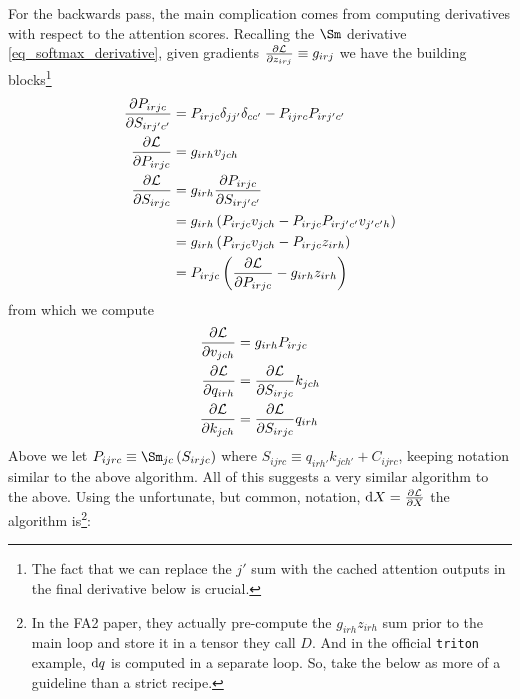 \documentclass[11pt]{article}
\begin{document}
For the backwards pass, the main complication comes from computing derivatives with respect to the
attention scores. Recalling the $ \Sm $ derivative \eqref{eq_softmax_derivative}, given gradients $
\frac{\partial \mathcal{L}   }{ \partial z _{ irj } } \equiv  g _{ irj } $ we have the building
blocks\footnote{The fact that we can replace the  $ j' $ sum with the cached attention outputs in
the final derivative below is crucial.}
\begin{align}
    \frac{ \partial P _{ irjc } }{ \partial S _{ irj'c' } } &= P _{ irjc}\delta _{ jj' }\delta _{ c c'} - P _{ ijrc } P _{ irj'c' } \nonumber\\
    \frac{ \partial \mathcal{L} }{ \partial P _{ irjc } } &= g _{ irh } v _{ jch }  \nonumber\\
    \frac{ \partial \mathcal{L} }{ \partial S _{ irjc } } &= g _{ irh } \frac{ \partial P _{ irjc } }{ \partial S _{ irj'c' } }\nonumber\\
                                                    &= g _{ irh } \left ( P _{ irjc } v _{ jch } - P _{ irjc } P _{ ir j'c' } v _{ j'c'h }  \right )  \nonumber\\
                                                    &= g _{ irh } \left ( P _{ irjc } v _{ jch } - P _{ irjc }  z _{irh }  \right )\nonumber\\
                                                    &= P _{ irjc }\left(\frac{ \partial \mathcal{L} }{ \partial P _{ irjc } }  -g _{ irh }   z _{irh } \right)\label{eq_fa2_derivative_building_blocks}
\end{align}
from which we compute
\begin{align}
    \frac{ \partial \mathcal{L} }{ \partial v _{ jch } } &= g _{ irh } P _{ irjc }  \nonumber\\
    \frac{ \partial \mathcal{L} }{ \partial q _{ irh } } &=  \frac{ \partial \mathcal{L} }{ \partial S _{ irjc } }k _{ jch } \nonumber\\
    \frac{ \partial \mathcal{L} }{ \partial k _{ jch } } &=  \frac{ \partial \mathcal{L} }{ \partial S _{ irjc } }q _{ irh }
\end{align}
Above we let $ P _{ ijrc } \equiv \Sm _{ jc}\left ( S _{ irjc } \right ) $ where $ S _{ ijrc }
\equiv   q _{ irh' } k _{ jch' } + C _{ ijrc }$, keeping notation similar to the above
algorithm. All of this suggests a very similar algorithm to the above. Using the unfortunate, but
common, notation,  $ {\rm d} X =  \frac{ \partial \mathcal{L}  }{ \partial X  } $ the algorithm is\footnote{In
the FA2 paper, they actually pre-compute the $ g _{ irh } z _{ irh } $  sum prior to the main loop
and store it in a tensor they call $ D $. And in the official \texttt{triton} example, $ {\rm d} q $ is
computed in a separate loop. So, take the below as more of a guideline than a strict recipe.}:
\end{document}
